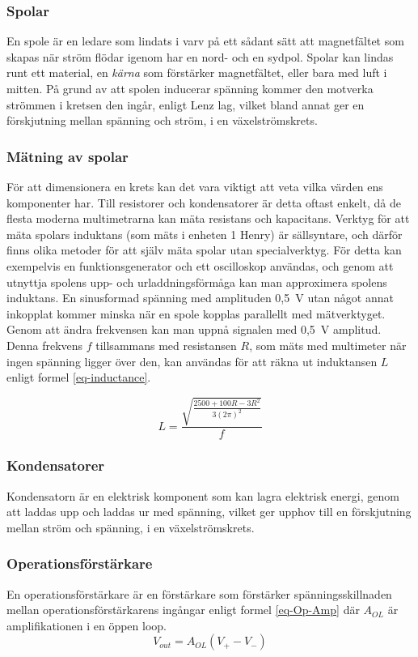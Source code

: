 \documentclass[a4paper]{article}
\begin{document}
\begin{sloppypar}
  \subsubsection{Spolar}
  En spole är en ledare som lindats i varv på ett sådant sätt att magnetfältet som skapas när ström flödar igenom har en nord- och en sydpol.
  Spolar kan lindas runt ett material, en \textit{kärna} som förstärker magnetfältet, eller bara med luft i mitten.
  På grund av att spolen inducerar spänning kommer den motverka strömmen i kretsen den ingår, enligt Lenz lag, vilket bland annat ger en förskjutning mellan spänning och ström, i en växelströmskrets.~\cite{digilar}
  \subsubsection{Mätning av spolar}
  För att dimensionera en krets kan det vara viktigt att veta vilka värden ens komponenter har.
  Till resistorer och kondensatorer är detta oftast enkelt, då de flesta moderna multimetrarna kan mäta resistans och kapacitans.
  Verktyg för att mäta spolars induktans (som mäts i enheten 1 Henry) är sällsyntare, och därför finns olika metoder för att själv mäta spolar utan specialverktyg.
  För detta kan exempelvis en funktionsgenerator och ett oscilloskop användas, och genom att utnyttja spolens upp- och urladdningsförmåga kan man approximera spolens induktans.
  En sinusformad spänning med amplituden 0,5~V utan något annat inkopplat kommer minska när en spole kopplas parallellt med mätverktyget. Genom att ändra frekvensen kan man uppnå signalen med 0,5~V amplitud.
  Denna frekvens $f$ tillsammans med resistansen $R$, som mäts med multimeter när ingen spänning ligger över den, kan användas för att räkna ut induktansen $L$ enligt formel \ref{eq-inductance}.~\cite{MeasureInductor}

  \begin{equation}
    \label{eq:inductance}
    L = \frac{\sqrt{\frac{2500+100R-3R^2}{3(2\pi)^2}}}{f}
  \end{equation}


  \subsubsection{Kondensatorer}
  Kondensatorn är en elektrisk komponent som kan lagra elektrisk energi, genom att laddas upp och laddas ur med spänning, vilket ger upphov till en förskjutning mellan ström och spänning, i en växelströmskrets.~\cite{digilar}

  \subsubsection{Operationsförstärkare}
  En operationsförstärkare är en förstärkare som förstärker spänningsskillnaden mellan operationsförstärkarens ingångar enligt formel \ref{eq-Op-Amp} där $A_{OL}$ är amplifikationen i en öppen loop.~\cite{wiki:Operational-amplifier}
  \begin{equation}
    \label{eq-Op-Amp}
    V_{out} = A_{OL}(V_+ - V_-)
  \end{equation}



\end{sloppypar}
\end{document}
